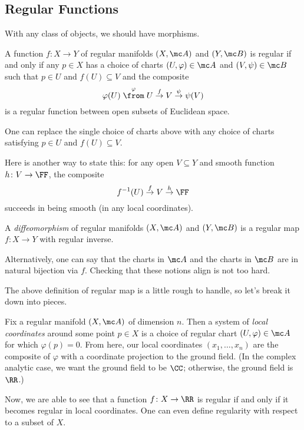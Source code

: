 \documentclass[../notes.tex]{subfiles}
\begin{document}
\subsection{Regular Functions}
With any class of objects, we should have morphisms.
\begin{definition}
	A function $f\colon X\to Y$ of regular manifolds $(X,\mc A)$ and $(Y,\mc B)$ is regular if and only if any $p\in X$ has a choice of charts $(U,\varphi)\in\mc A$ and $(V,\psi)\in\mc B$ such that $p\in U$ and $f(U)\subseteq V$ and the composite
	\[\varphi(U)\stackrel\varphi\from U\stackrel f\to V\stackrel\psi\to\psi(V)\]
	is a regular function between open subsets of Euclidean space.
\end{definition}
\begin{remark}
	One can replace the single choice of charts above with any choice of charts satisfying $p\in U$ and $f(U)\subseteq V$.
\end{remark}
\begin{remark}
	Here is another way to state this: for any open $V\subseteq Y$ and smooth function $h\colon V\to\FF$, the composite
	\[f^{-1}(U)\stackrel f\to V\stackrel h\to\FF\]
	succeeds in being smooth (in any local coordinates).
\end{remark}
\begin{definition}[diffeomorphism]
	A \textit{diffeomorphism} of regular manifolds $(X,\mc A)$ and $(Y,\mc B)$ is a regular map $f\colon X\to Y$ with regular inverse.
\end{definition}
\begin{remark}
	Alternatively, one can say that the charts in $\mc A$ and the charts in $\mc B$ are in natural bijection via $f$. Checking that these notions align is not too hard.
\end{remark}
The above definition of regular map is a little rough to handle, so let's break it down into pieces.
\begin{definition}
	Fix a regular manifold $(X,\mc A)$ of dimension $n$. Then a system of \textit{local coordinates} around some point $p\in X$ is a choice of regular chart $(U,\varphi)\in\mc A$ for which $\varphi(p)=0$. From here, our local coordinates $(x_1,\ldots,x_n)$ are the composite of $\varphi$ with a coordinate projection to the ground field. (In the complex analytic case, we want the ground field to be $\CC$; otherwise, the ground field is $\RR$.)
\end{definition}
Now, we are able to see that a function $f\colon X\to\RR$ is regular if and only if it becomes regular in local coordinates. One can even define regularity with respect to a subset of $X$.
\end{document}
